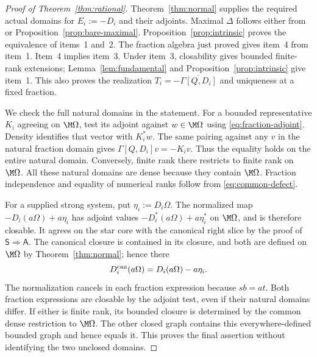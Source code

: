 \begin{proof}[Proof of Theorem~\ref{thm:rational}]
Theorem~\ref{thm:normal} supplies the required actual domains for $E_i:=-D_i$ and their adjoints.
Maximal $\Delta$ follows either from \cite[Proposition~3.5]{ACSY24} or Proposition~\ref{prop:bare-maximal}.
Proposition~\ref{prop:intrinsic} proves the equivalence of items~1 and~2.
The fraction algebra just proved gives item~4 from item~1.
Item~4 implies item~3.
Under item~3, closability gives bounded finite-rank extensions; Lemma~\ref{lem:fundamental} and Proposition~\ref{prop:intrinsic} give item~1.
This also proves the realization $T_i=-\overline{\Gamma[Q,D_i]}$ and uniqueness at a fixed fraction.

We check the full natural domains in the statement.
For a bounded representative $K_i$ agreeing on $\M\Omega$, test its adjoint against $w\in\M\Omega$ using \eqref{eq:fraction-adjoint}.
Density identifies that vector with $K_i^*w$.
The same pairing against any $v$ in the natural fraction domain gives $\Gamma[Q,D_i]v=-K_iv$.
Thus the equality holds on the entire natural domain.
Conversely, finite rank there restricts to finite rank on $\M\Omega$.
All these natural domains are dense because they contain $\M\Omega$.
Fraction independence and equality of numerical ranks follow from \eqref{eq:common-defect}.

For a supplied strong system, put $\eta_i:=D_i\Omega$.
The normalized map $-D_i(a\Omega)+a\eta_i$ has adjoint values $-D_i^*(a\Omega)+a\eta_i^*$ on $\M\Omega$, and is therefore closable.
It agrees on the star core with the canonical right slice by the proof of $\mathsf S\Rightarrow\mathsf A$.
The canonical closure is contained in its closure, and both are defined on $\M\Omega$ by Theorem~\ref{thm:normal}; hence there
\[
 D_i^{\rm can}(a\Omega)=D_i(a\Omega)-a\eta_i.
\]
The normalization cancels in each fraction expression because $sb=at$.
Both fraction expressions are closable by the adjoint test, even if their natural domains differ.
If either is finite rank, its bounded closure is determined by the common dense restriction to $\M\Omega$.
The other closed graph contains this everywhere-defined bounded graph and hence equals it.
This proves the final assertion without identifying the two unclosed domains.
\end{proof}

